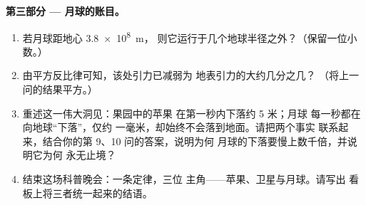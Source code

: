 \begin{problem}
\medskip\noindent\textbf{第三部分 --- 月球的账目。}
\begin{enumerate}[resume]
  \item 若月球距地心 \qty{3.8e8}{m}，
        则它运行于几个地球半径之外？（保留一位小数。）
  \item 由平方反比律可知，该处引力已减弱为
        地表引力的大约几分之几？
        （将上一问的结果平方。）
  \item 重述这一伟大洞见：果园中的苹果
        在第一秒内下落约 5 米；月球
        每一秒都在向地球“下落”，仅约
        一毫米，却始终不会落到地面。请把两个事实
        联系起来，结合你的第 9、10 问的答案，说明为何
        月球的下落要慢上数千倍，并说明它为何
        永无止境？
  \item 结束这场科普晚会：一条定律，三位
        主角——苹果、卫星与月球。请写出
        看板上将三者统一起来的结语。
\end{enumerate}
\end{problem}
